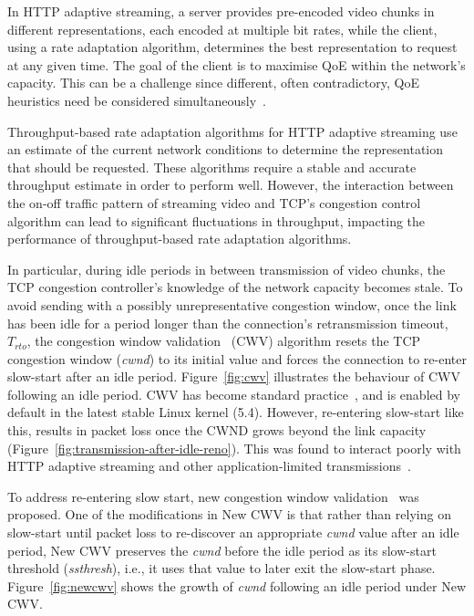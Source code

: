\documentclass[10pt,sigconf]{acmart}
\begin{document}
In HTTP adaptive streaming, a server provides pre-encoded video chunks in different representations, each encoded at multiple bit rates, while the client, using a rate adaptation algorithm, determines the best representation to request at any given time. The goal of the client is to maximise QoE within the network's capacity. This can be a challenge since different, often contradictory, QoE heuristics need be considered simultaneously~\cite{Seufert-2015-A-Survey-on-QoE-Dash}. 

Throughput-based rate adaptation algorithms for HTTP adaptive streaming use an estimate of the current network conditions to determine the representation that should be requested. These algorithms require a stable and accurate throughput estimate in order to perform well. However, the interaction between the on-off traffic pattern of streaming video and TCP's congestion control algorithm can lead to significant fluctuations in throughput, impacting the performance of throughput-based rate adaptation algorithms.


In particular, during idle periods in between transmission of video chunks, the TCP congestion controller's knowledge of the network capacity becomes stale. To avoid sending with a possibly unrepresentative congestion window, once the link has been idle for a period longer than the connection's retransmission timeout, $T_{rto}$, the congestion window validation~\cite{rfc2861-2000-padhye-congestion-window-validation} (CWV) algorithm resets the TCP congestion window (\emph{cwnd}) to its initial value and forces the connection to re-enter slow-start after an idle period. Figure~\ref{fig:cwv} illustrates the behaviour of CWV following an idle period. CWV has become standard practice~\cite{rfc5681-congeston-control}, and is enabled by default in the latest stable Linux kernel (5.4). However, re-entering slow-start like this, results in packet loss once the CWND grows beyond the link capacity (Figure~\ref{fig:transmission-after-idle-reno}). This was found to interact poorly with HTTP adaptive streaming and other application-limited transmissions~\cite{Esteban-2012-Interactions-HTTP-TCP}.

To address re-entering slow start, new congestion window validation~\cite{rfc7661-2015-fairhurst-new-cwnd-validation} was proposed. One of the modifications in New CWV is that rather than relying on slow-start until packet loss to re-discover an appropriate \emph{cwnd} value after an idle period, New CWV preserves the \emph{cwnd} before the idle period as its slow-start threshold (\emph{ssthresh}), i.e., it uses that value to later exit the slow-start phase. Figure~\ref{fig:newcwv} shows the growth of \emph{cwnd} following an idle period under New CWV.
\end{document}
